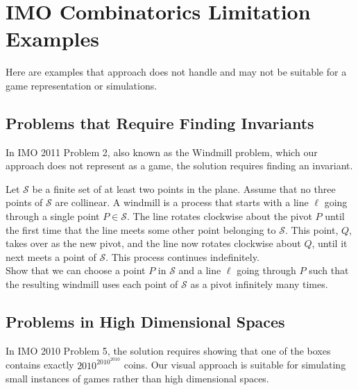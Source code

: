 \section{IMO Combinatorics Limitation Examples}
\label{appendix:L}

Here are examples that approach does not handle and may not be suitable for a game representation or simulations.

\subsection{Problems that Require Finding Invariants}
In IMO 2011 Problem 2, also known as the Windmill problem, which our approach does not represent as a game, the solution requires finding an invariant.

\begin{tcolorbox}[enhanced, breakable, rounded corners,
    colback=red!5!white, colframe=red!75!black,
    colbacktitle=red!85!black, fonttitle=\bfseries, coltitle=white, title=IMO 2011 Problem 2 (Windmill)]

\setlength{\parskip}{1em}
Let $\mathcal{S}$ be a finite set of at least two points in the plane. Assume that no three points of $\mathcal{S}$ are collinear. A windmill is a process that starts with a line $\ell$ going through a single point $P \in \mathcal{S}$. The line rotates clockwise about the pivot $P$ until the first time that the line meets some other point belonging to $\mathcal{S}$. This point, $Q$, takes over as the new pivot, and the line now rotates clockwise about $Q$, until it next meets a point of $\mathcal{S}$. This process continues indefinitely.\\
Show that we can choose a point $P$ in $\mathcal{S}$ and a line $\ell$ going through $P$ such that the resulting windmill uses each point of $\mathcal{S}$ as a pivot infinitely many times.
\end{tcolorbox}


\subsection{Problems in High Dimensional Spaces}
In IMO 2010 Problem 5, the solution requires showing that one of the boxes contains exactly $2010^{2010^{2010}}$ coins. Our visual approach is suitable for simulating small instances of games rather than high dimensional spaces.

